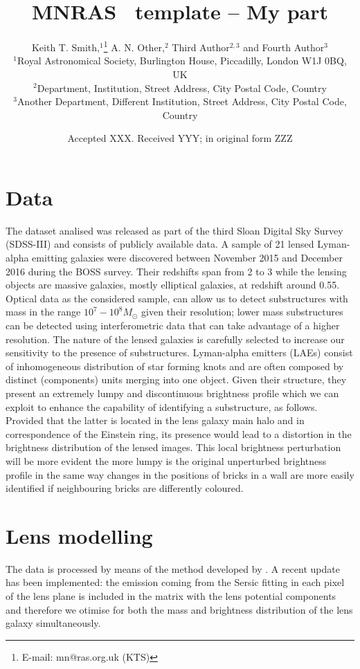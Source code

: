 \documentclass[a4paper,fleqn,usenatbib]{mnras}
\title[Short title, max. 45 characters]{MNRAS \LaTeXe\ template -- My part}
\author[K. T. Smith et al.]{
Keith T. Smith,$^{1}$\thanks{E-mail: mn@ras.org.uk (KTS)}
A. N. Other,$^{2}$
Third Author$^{2,3}$
and Fourth Author$^{3}$
\\
$^{1}$Royal Astronomical Society, Burlington House, Piccadilly, London W1J 0BQ, UK\\
$^{2}$Department, Institution, Street Address, City Postal Code, Country\\
$^{3}$Another Department, Different Institution, Street Address, City Postal Code, Country
}
\date{Accepted XXX. Received YYY; in original form ZZZ}
\begin{document}
\label{firstpage}
\pagerange{\pageref{firstpage}--\pageref{lastpage}}
\maketitle



\section{Data}
The dataset analised was released as part of the third Sloan Digital Sky Survey (SDSS-III) and consists of publicly available data. A sample of 21 lensed Lyman-alpha emitting galaxies were discovered between November 2015 and December 2016 during the BOSS survey. Their redshifts span from 2 to 3 while the lensing objects are massive galaxies, mostly elliptical galaxies, at redshift around 0.55.
Optical data as the considered sample, can allow us to detect substructures with mass in the range $10^7 - 10^8 M_{\odot}$ given their resolution; lower mass substructures can be detected using interferometric data that can take advantage of a higher resolution.
The nature of the lensed galaxies is carefully selected to increase our sensitivity to the presence of substructures. Lyman-alpha emitters (LAEs) consist of inhomogeneous distribution of star forming knots and are often composed by distinct (components) units merging into one object. Given their structure, they present an extremely lumpy and discontinuous brightness profile which we can exploit to enhance the capability of identifying a substructure, as follows. Provided that the latter is located in the lens galaxy main halo and in correspondence of the Einstein ring, its presence would lead to a distortion in the brightness distribution of the lensed images. This local brightness perturbation will be more evident the more lumpy is the original unperturbed brightness profile in the same way changes in the positions of bricks in a wall are more easily identified if neighbouring bricks are differently coloured.

\section{Lens modelling}
The data is processed by means of the method developed by \citet{method}. A recent update has been implemented: the emission coming from the Sersic fitting in each pixel of the lens plane is included in the matrix with the lens potential components and therefore we otimise for both the mass and brightness distribution of the lens galaxy simultaneously.
\end{document}
